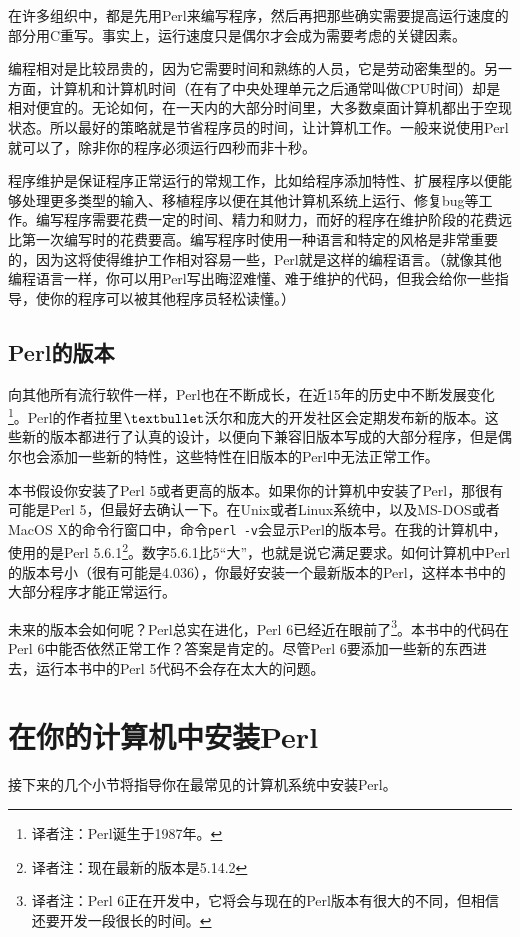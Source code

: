 在许多组织中，都是先用Perl来编写程序，然后再把那些确实需要提高运行速度的部分用C重写。事实上，运行速度只是偶尔才会成为需要考虑的关键因素。

编程相对是比较昂贵的，因为它需要时间和熟练的人员，它是劳动密集型的。另一方面，计算机和计算机时间（在有了中央处理单元之后通常叫做CPU时间）却是相对便宜的。无论如何，在一天内的大部分时间里，大多数桌面计算机都出于空现状态。所以最好的策略就是节省程序员的时间，让计算机工作。一般来说使用Perl就可以了，除非你的程序必须运行四秒而非十秒。

程序维护是保证程序正常运行的常规工作，比如给程序添加特性、扩展程序以便能够处理更多类型的输入、移植程序以便在其他计算机系统上运行、修复bug等工作。编写程序需要花费一定的时间、精力和财力，而好的程序在维护阶段的花费远比第一次编写时的花费要高。编写程序时使用一种语言和特定的风格是非常重要的，因为这将使得维护工作相对容易一些，Perl就是这样的编程语言。（就像其他编程语言一样，你可以用Perl写出晦涩难懂、难于维护的代码，但我会给你一些指导，使你的程序可以被其他程序员轻松读懂。）

\subsection{Perl的版本}
向其他所有流行软件一样，Perl也在不断成长，在近15年的历史中不断发展变化\footnote{译者注：Perl诞生于1987年。}。Perl的作者拉里$\textbullet$沃尔和庞大的开发社区会定期发布新的版本。这些新的版本都进行了认真的设计，以便向下兼容旧版本写成的大部分程序，但是偶尔也会添加一些新的特性，这些特性在旧版本的Perl中无法正常工作。

本书假设你安装了Perl 5或者更高的版本。如果你的计算机中安装了Perl，那很有可能是Perl 5，但最好去确认一下。在Unix或者Linux系统中，以及MS-DOS或者MacOS X的命令行窗口中，命令\verb|perl -v|会显示Perl的版本号。在我的计算机中，使用的是Perl 5.6.1\footnote{译者注：现在最新的版本是5.14.2}。数字5.6.1比5“大”，也就是说它满足要求。如何计算机中Perl的版本号小（很有可能是4.036），你最好安装一个最新版本的Perl，这样本书中的大部分程序才能正常运行。

未来的版本会如何呢？Perl总实在进化，Perl 6已经近在眼前了\footnote{译者注：Perl 6正在开发中，它将会与现在的Perl版本有很大的不同，但相信还要开发一段很长的时间。}。本书中的代码在Perl 6中能否依然正常工作？答案是肯定的。尽管Perl 6要添加一些新的东西进去，运行本书中的Perl 5代码不会存在太大的问题。

\section{在你的计算机中安装Perl}
接下来的几个小节将指导你在最常见的计算机系统中安装Perl。


